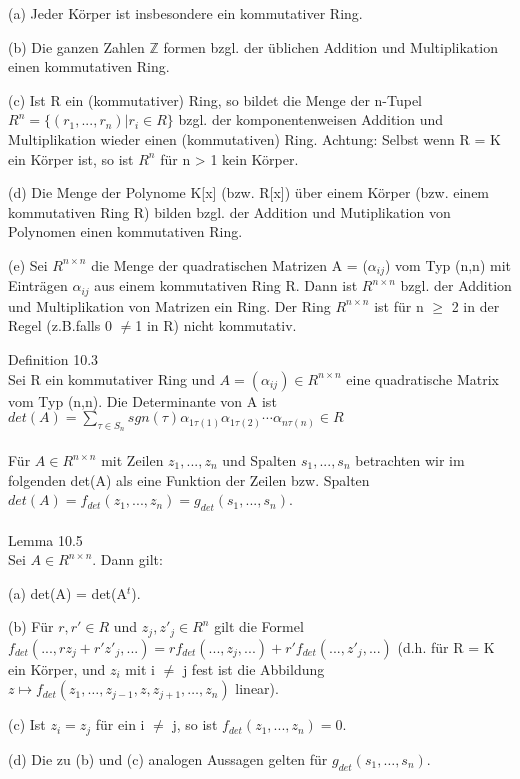 \begin{compactenum}
\item[(a)] Jeder Körper ist insbesondere ein kommutativer Ring.
\item[(b)] Die ganzen Zahlen $\mathbb{Z}$ formen bzgl. der üblichen Addition und Multiplikation einen kommutativen Ring.
\item[(c)] Ist R ein (kommutativer) Ring, so bildet die Menge der n-Tupel $R^n = \{(r_1,..., r_n) | r_i \in R\}$ bzgl. der komponentenweisen Addition und Multiplikation wieder einen (kommutativen) Ring. Achtung: Selbst wenn R = K ein Körper ist, so ist $R^n$ für n > 1 kein Körper.
\item[(d)] Die Menge der Polynome K[x] (bzw. R[x]) über einem Körper (bzw. einem kommutativen Ring R) bilden bzgl. der Addition und Mutiplikation von Polynomen einen kommutativen Ring.
\item[(e)] Sei $R^{n \times n}$ die Menge der quadratischen Matrizen A = ($\alpha_{ij}$) vom Typ (n,n) mit Einträgen $\alpha_{ij}$ aus einem kommutativen Ring R. Dann ist $R^{n \times n}$ bzgl. der Addition und Multiplikation von Matrizen ein Ring. Der Ring $R^{n \times n}$ ist für n $\ge$ 2 in der Regel (z.B.falls 0 $\neq$1 in R) nicht kommutativ.\\
\end{compactenum}
Definition 10.3\\
Sei R ein kommutativer Ring und $A = (\alpha_{ij}) \in R^{n \times n}$ eine quadratische Matrix vom Typ (n,n). Die Determinante von A ist $det(A) = \sum\nolimits_{\tau \in S_n} sgn(\tau) \alpha_{1\tau(1)} \alpha_{1 \tau(2)} \cdots \alpha_{n \tau(n)} \in R$\\
\\
Für $A \in R^{n \times n}$ mit Zeilen $z_1, ..., z_n$ und Spalten $s_1, ..., s_n$ betrachten wir im folgenden det(A) als eine Funktion der Zeilen bzw. Spalten $det(A) = f_{det}(z_1,..., z_n) = g_{det}(s_1, ..., s_n)$.\\
\\
Lemma 10.5\\
Sei $A \in R^{n \times n}$. Dann gilt:
\begin{compactenum}
\item[(a)] det(A) = det(A$^t$).
\item[(b)] Für $r, r' \in R$ und $z_j,z'_j \in R^n$ gilt die Formel $f_{det}(...,rz_j + r'z'_j,...) = r f_{det}(...,z_j,...) + r' f_{det}(...,z'_j,...)$ (d.h. für R = K ein Körper, und $z_i$ mit i $\neq$ j fest ist die Abbildung $z \mapsto f_{det}(z_1,… , z_{j-1}, z, z_{j+1},… , z_n)$ linear). 
\item[(c)] Ist $z_i = z_j$ für ein i $\neq$ j, so ist $f_{det}(z_1, ..., z_n) = 0$.
\item[(d)] Die zu (b) und (c) analogen Aussagen gelten für $g_{det}(s_1, …, s_n)$.\\
\end{compactenum}
